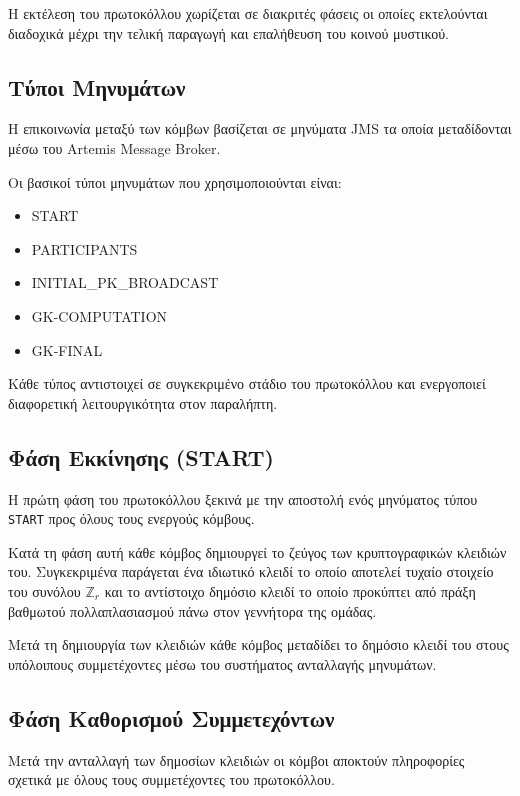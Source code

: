\documentclass[12pt,a4paper]{report}
\begin{document}
Η εκτέλεση του πρωτοκόλλου χωρίζεται σε διακριτές φάσεις οι οποίες
εκτελούνται διαδοχικά μέχρι την τελική παραγωγή και επαλήθευση του
κοινού μυστικού.

\subsection{Τύποι Μηνυμάτων}

Η επικοινωνία μεταξύ των κόμβων βασίζεται σε μηνύματα
JMS τα οποία μεταδίδονται μέσω του Artemis Message Broker.

Οι βασικοί τύποι μηνυμάτων που χρησιμοποιούνται είναι:

\begin{itemize}
\item START
\item PARTICIPANTS
\item INITIAL\_PK\_BROADCAST
\item GK-COMPUTATION
\item GK-FINAL
\end{itemize}

Κάθε τύπος αντιστοιχεί σε συγκεκριμένο στάδιο του
πρωτοκόλλου και ενεργοποιεί διαφορετική λειτουργικότητα
στον παραλήπτη.

\subsection{Φάση Εκκίνησης (START)}

Η πρώτη φάση του πρωτοκόλλου ξεκινά με την αποστολή ενός μηνύματος
τύπου \texttt{START} προς όλους τους ενεργούς κόμβους.

Κατά τη φάση αυτή κάθε κόμβος δημιουργεί το ζεύγος των
κρυπτογραφικών κλειδιών του. Συγκεκριμένα παράγεται ένα ιδιωτικό
κλειδί το οποίο αποτελεί τυχαίο στοιχείο του συνόλου
$\mathbb{Z}_r$ και το αντίστοιχο δημόσιο κλειδί το οποίο
προκύπτει από πράξη βαθμωτού πολλαπλασιασμού πάνω στον γεννήτορα
της ομάδας.

Μετά τη δημιουργία των κλειδιών κάθε κόμβος μεταδίδει το δημόσιο
κλειδί του στους υπόλοιπους συμμετέχοντες μέσω του συστήματος
ανταλλαγής μηνυμάτων.

\subsection{Φάση Καθορισμού Συμμετεχόντων}

Μετά την ανταλλαγή των δημοσίων κλειδιών οι κόμβοι αποκτούν
πληροφορίες σχετικά με όλους τους συμμετέχοντες του πρωτοκόλλου.
\end{document}

